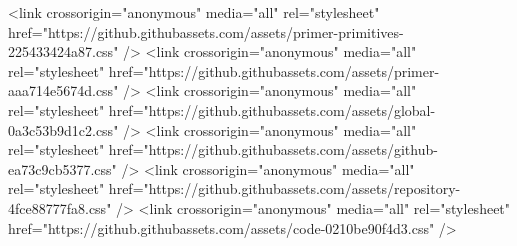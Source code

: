     <link crossorigin="anonymous" media="all" rel="stylesheet" href="https://github.githubassets.com/assets/primer-primitives-225433424a87.css" />
    <link crossorigin="anonymous" media="all" rel="stylesheet" href="https://github.githubassets.com/assets/primer-aaa714e5674d.css" />
    <link crossorigin="anonymous" media="all" rel="stylesheet" href="https://github.githubassets.com/assets/global-0a3c53b9d1c2.css" />
    <link crossorigin="anonymous" media="all" rel="stylesheet" href="https://github.githubassets.com/assets/github-ea73c9cb5377.css" />
  <link crossorigin="anonymous" media="all" rel="stylesheet" href="https://github.githubassets.com/assets/repository-4fce88777fa8.css" />
<link crossorigin="anonymous" media="all" rel="stylesheet" href="https://github.githubassets.com/assets/code-0210be90f4d3.css" />

  


